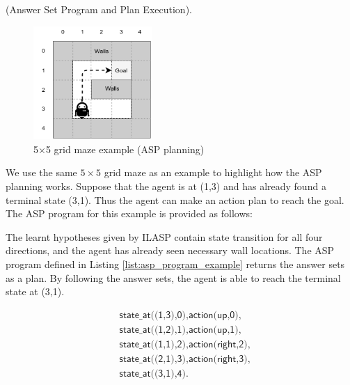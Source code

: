 \begin{examp} \normalfont (Answer Set Program and Plan Execution).

\begin{figure}[!htb]
\centering
\includegraphics[width=0.4\textwidth]{./figures/asp_example}
\caption{5$\times$5 grid maze example (ASP planning)}
\label{environment_example}
\end{figure}
We use the same $5 \times 5$ grid maze as an example to highlight how the ASP planning works. 
Suppose that the agent is at (1,3) and has already found a terminal state (3,1).
Thus the agent can make an action plan to reach the goal. The ASP program for this example is provided as follows:


The learnt hypotheses given by ILASP contain state transition for all four directions, and the agent has already seen necessary wall locations. The ASP program defined in Listing \ref{list:asp_program_example} returns the answer sets as a plan. By following the answer sets, the agent is able to reach the terminal state at (3,1).

\begin{equation*}
\begin{split}
&\textsf{state\_at((1,3),0),action(up,0),}\\
&\textsf{state\_at((1,2),1),action(up,1),}\\
&\textsf{state\_at((1,1),2),action(right,2),}\\ 
&\textsf{state\_at((2,1),3),action(right,3),}\\
&\textsf{state\_at((3,1),4).} 
\end{split}
\end{equation*}
\end{examp}
